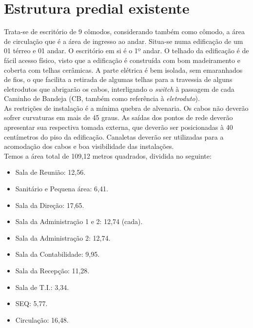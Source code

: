 \documentclass[	DIV=calc,%
							paper=a4,%
							fontsize=12pt,%
							onecolumn]{scrartcl}	 					%
\begin{document}
\pagebreak
\section{Estrutura predial existente}

Trata-se de escritório de 9 cômodos, considerando também como cômodo, a área de circulação que é a área de ingresso ao andar. Situa-se numa edificação de um 01 térreo e 01 andar. O escritório em si é o 1º andar. O telhado da edificação é de fácil acesso físico, visto que a edificação é construída com bom madeiramento e coberta com telhas cerâmicas. A parte elétrica é bem isolada, sem emaranhados de fios, o que facilita a retirada de algumas telhas para a travessia de alguns eletrodutos que abrigarão os cabos, interligando o \textit{switch} à passagem de cada Caminho de Bandeja (CB, também como referência à \textit{eletroduto}).
\\

As restrições de instalação é a mínima quebra de alvenaria. Os cabos não deverão sofrer curvaturas em mais de 45 graus. As saídas dos pontos de rede deverão apresentar sua respectiva tomada externa, que deverão ser posicionadas à 40 centímetros do piso da edificação. Canaletas deverão ser utilizadas para a acomodação dos cabos e boa visibilidade das instalações.
\\

Temos a área total de 109,12 metros quadrados, dividida no seguinte:

\begin{itemize}
	\item Sala de Reunião: 12,56.
	\item Sanitário e Pequena área: 6,41.
	\item Sala da Direção: 17,65.
	\item Sala da Administração 1 e 2: 12,74 (cada).
	\item Sala da Administração 2: 12,74.
	\item Sala da Contabilidade: 9,95.
	\item Sala da Recepção: 11,28.
	\item Sala de T.I.: 3,34.
	\item SEQ: 5,77.
	\item Circulação: 16,48.
	
	
\end{itemize}


\clearpage 
\thispagestyle{plain}

\recalctypearea
\end{document}
